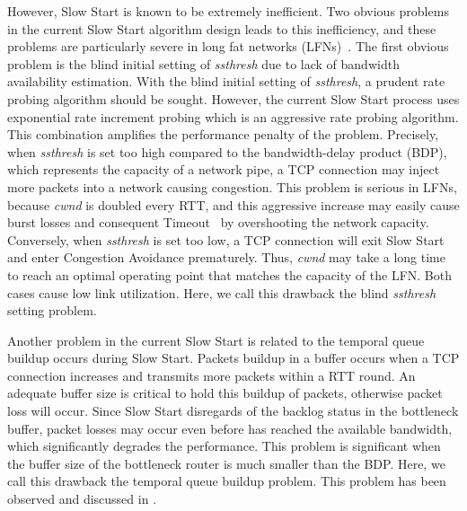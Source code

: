 \documentclass[12pt,onecolumn]{IEEEtran}
\begin{document}
However, Slow Start is known to be extremely inefficient. Two obvious problems
in the current Slow Start algorithm design leads to this inefficiency, and
these problems are particularly severe in long fat networks
(LFNs)~\cite{count1,count2}. The first obvious problem is the blind initial
setting of \emph{ssthresh} due to lack of bandwidth availability estimation.
With the blind initial setting of \emph{ssthresh}, a prudent rate probing
algorithm should be sought. However, the current Slow Start process uses
exponential rate increment probing which is an aggressive rate probing
algorithm. This combination amplifies the performance penalty of the problem.
Precisely, when \emph{ssthresh} is set too high compared to the bandwidth-delay
product (BDP), which represents the capacity of a network pipe, a TCP
connection may inject more packets into a network causing congestion. This
problem is serious in LFNs, because \emph{cwnd} is doubled every RTT, and this
aggressive increase may easily cause burst losses and consequent
Timeout~\cite{reno} by overshooting the network capacity. Conversely, when
\emph{ssthresh} is set too low, a TCP connection will exit Slow Start and enter
Congestion Avoidance prematurely. Thus, \emph{cwnd} may take a long time to
reach an optimal operating point that matches the capacity of the LFN. Both
cases cause low link utilization. Here, we call this drawback the blind
\emph{ssthresh} setting problem.
 

Another problem in the current Slow Start is related to the temporal queue
buildup occurs during Slow Start. Packets buildup in a buffer occurs when a TCP
connection increases  and transmits more packets within a RTT round. An
adequate buffer size is critical to hold this buildup of packets, otherwise
packet loss will occur. Since Slow Start disregards of the backlog status in
the bottleneck buffer, packet losses may occur even before  has reached
the available bandwidth, which significantly degrades the performance. This
problem is significant when the buffer size of the bottleneck router is much
smaller than the BDP. Here, we call this drawback the temporal queue buildup
problem. This problem has been observed and discussed in \cite{tcpw-a}.

\begin{comment}
Currently, several works have been proposed to use rate and delay measurements
to determinate the bottleneck buffer size. The works presented
in~\cite{buffer1} and~\cite{buffer3} use bottleneck link capacity estimated by
Eligible Rate Estimation\cite{westwood} and Residual Capacity
Estimator~\cite{RCE}, respectively, combined with measured RTT to infer a
buffer size. Most recently, Dispersion Delta Filtering~\cite{buffer2} proposes
to combine RTT as well as packet dispersion to give an more accurate estimation
of bottleneck buffer size. However, not many attentions have been placed on the
negative impact of small buffer. \end{comment}
\end{document}
